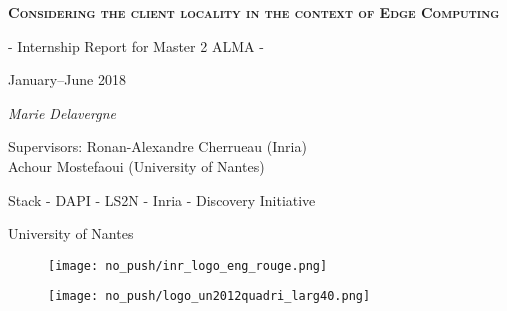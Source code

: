 \documentclass[a4paper, 10pt, titlepage]{report}
\begin{document}
%
{}

\begin{titlepage}
  \centering
      {\scshape\LARGE\bfseries Considering the client locality in the context of Edge Computing \par}
      \vspace{1cm}
             {\Large - Internship Report for Master 2 ALMA -\par}
             {\Large January--June 2018 \par}
             \vspace{1.5cm}
               	    {\Large\itshape Marie Delavergne\par}

	            \vfill


                    {\large Supervisors: Ronan-Alexandre Cherrueau (Inria)\\
                      \hspace{3.45cm}Achour Mostefaoui (University of Nantes)\par}
                          \vspace{2cm}
                    {\large Stack - DAPI - LS2N - Inria - Discovery Initiative\par}
	            {\large University of Nantes\par}
                          \vspace{0.5cm}
                    \begin{figure}[!h]\centering
                      \begin {minipage}{0.3\textwidth}                        \centerline{\texttt{[image: no\_push/inr\_logo\_eng\_rouge.png]}}
                        \label{Fig:inria}
                      \end{minipage}
                      \begin{minipage}{0.3\textwidth}                   \centerline{\texttt{[image: no\_push/logo\_un2012quadri\_larg40.png]}}
                        \label{Fig:univnantes}
                      \end{minipage}


                    \end{figure}


\end{titlepage}
\restoregeometry
\end{document}
